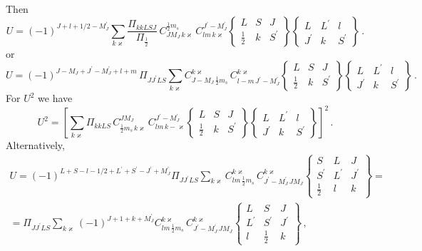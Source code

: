 \documentclass[a4paper,oneside,12pt]{extarticle}
\begin{document}
%
Then
%
\begin{equation}
U =
%
(-1)^{J+l+1/2-M_J^{\prime}}
\sum_{k \varkappa}
\frac{\Pi_{kkLSJ}}{\Pi_{\frac{1}{2}}} \,
C^{\frac{1}{2} m_s}_{J M_J \, k\varkappa} \,
C^{J^{\prime} -M_J^{\prime}}_{lm \, k\varkappa}
\left \{
\begin{array}{ccc}
L & S & J \\
\frac{1}{2} & k & S^{\prime}
\end{array}
\right \}
\left \{
\begin{array}{ccc}
L & L^{\prime} & l \\
J^{\prime} & k & S^{\prime}
\end{array}
\right \} \,.
\label{Ufin}
\end{equation}
%
or
%
\begin{equation}
U = (-1)^{J-M_J+J^{\prime}-M_J^{\prime}+l+m} \, \Pi_{JJ^{\prime}LS}
\sum_{k \varkappa}
C^{k\varkappa}_{J -M_J \, \frac{1}{2} m_s} \,
C^{k\varkappa}_{l -m \, J^{\prime} -M_J^{\prime}}
\left \{
\begin{array}{ccc}
L & S & J \\
\frac{1}{2} & k & S^{\prime}
\end{array}
\right \}
\left \{
\begin{array}{ccc}
L & L^{\prime} & l \\
J^{\prime} & k & S^{\prime}
\end{array}
\right \} \,.
\label{Ufin1}
\end{equation}
%
For $U^2$ we have
\begin{equation}
U^2 = \left[
\sum_{k \varkappa}
\Pi_{kkLS} \,
C^{J M_J}_{\frac{1}{2} m_s \, k\varkappa} \,
C^{J^{\prime} -M_J^{\prime}}_{lm \, k-\varkappa}
\left \{
\begin{array}{ccc}
L & S & J \\
\frac{1}{2} & k & S^{\prime}
\end{array}
\right \}
\left \{
\begin{array}{ccc}
L & L^{\prime} & l \\
J^{\prime} & k & S^{\prime}
\end{array}
\right \}
\right]^2 \,.
\label{U2}
\end{equation}
%
Alternatively,
\begin{multline}
U =
%
(-1)^{L+S-l-1/2+L^{\prime}+S^{\prime}-J^{\prime}+M_J^{\prime}}
\Pi_{JJ^{\prime}LS}
\sum_{k \varkappa}
C^{k\varkappa}_{lm \, \frac{1}{2}m_s} \,
C^{k\varkappa}_{J^{\prime} -M_J^{\prime} \, J M_J}
\left \{
\begin{array}{ccc}
S & L & J \\
S^{\prime} & L^{\prime} & J^{\prime} \\
\frac{1}{2} & l & k
\end{array}
\right \} = \\ =
%
\Pi_{JJ^{\prime}LS}
\sum_{k \varkappa}
(-1)^{J+1+k +M_J^{\prime}}
C^{k\varkappa}_{lm \, \frac{1}{2}m_s} \,
C^{k\varkappa}_{J^{\prime} -M_J^{\prime} \, J M_J}
\left \{
\begin{array}{ccc}
L & S & J \\
L^{\prime} & S^{\prime} & J^{\prime} \\
l & \frac{1}{2} & k
\end{array}
\right \} \,,
\label{Ufin2}
\end{multline}
\end{document}
